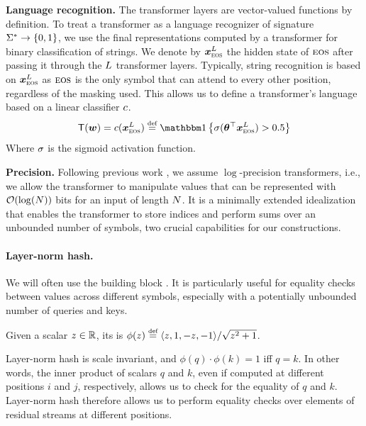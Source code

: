 \documentclass{article}
\begin{document}
\textbf{Language recognition.}
The transformer layers are vector-valued functions by definition.
To treat a transformer as a language recognizer of signature ${{{{ \Sigma}}^*}} \to {{\{ 0,1 \}}}$, we use the final representations computed by a transformer for binary classification of strings. 
We denote by ${{{ \bm{x}}}}_{{{\textsc{eos}}}}^{{L}}$ the hidden state of ${{\textsc{eos}}}$ after passing it through the ${L}$ transformer layers. 
Typically, string recognition is based on ${{{ \bm{x}}}}_{{{\textsc{eos}}}}^{{L}}$ as ${{\textsc{eos}}}$ is the only symbol that can attend to every other position, regardless of the masking used.
This allows us to define a transformer's language based on a linear classifier ${{ c}}$.
\begin{equation}
    \tf(\str)=\funcc(\vx_{\eos}^{\nLayers}) \defeq \ind{\sigmoid(\vtheta^\top \vx_{\eos}^{\nLayers}) > 0.5}
\end{equation}
Where ${{ \sigma}}$ is the sigmoid activation function.

\textbf{Precision.}
Following previous work \citep{merrill2025exactexpressivepowertransformers, merrill2024expressivepowertransformerschain, merrill-logic}, we assume $\log$-precision transformers, i.e., we allow the transformer to manipulate values that can be represented with ${{ \mathcal{O}}}(\log({{ N}}))$ bits for an input of length ${{ N}}$. It is a minimally extended idealization that enables the transformer to store indices and perform sums over an unbounded number of symbols, two crucial capabilities for our constructions.

\paragraph{Layer-norm hash.}
We will often use the  building block \citep{merrill2024expressivepowertransformerschain}. 
It is particularly useful for equality checks between values across different symbols, especially with a potentially unbounded number of queries and keys.
\begin{definition}\label{def:layernormhash}
    Given a scalar ${{{ z}}} \in \mathbb{R}$, its  is $\phi(\evz) \defeq \langle \evz, 1, -\evz, -1 \rangle / \sqrt{\evz^2+1}$.
\end{definition}
Layer-norm hash is scale invariant, and $\phi(q) \cdot \phi(k) = 1$ iff $q = k$. In other words, the inner product of scalars $q$ and $k$, even if computed at different positions $i$ and $j$, respectively, allows us to check for the equality of $q$ and $k$. Layer-norm hash therefore allows us to perform equality checks over elements of residual streams at different positions.
\end{document}
